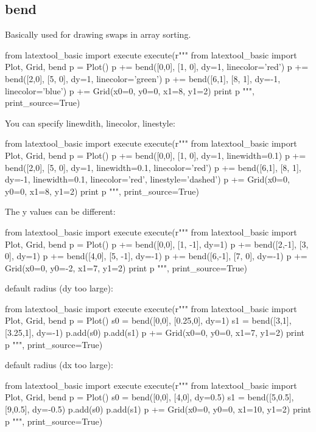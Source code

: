 \subsection{bend}

Basically used for drawing swaps in array sorting.


\begin{python}
from latextool_basic import execute
execute(r"""
from latextool_basic import Plot, Grid, bend
p = Plot()
p += bend([0,0], [1, 0], dy=1, linecolor='red')
p += bend([2,0], [5, 0], dy=1, linecolor='green')
p += bend([6,1], [8, 1], dy=-1, linecolor='blue')
p += Grid(x0=0, y0=0, x1=8, y1=2)
print p
""", print_source=True)
\end{python}


You can specify linewdith, linecolor, linestyle:
\begin{python}
from latextool_basic import execute
execute(r"""
from latextool_basic import Plot, Grid, bend
p = Plot()
p += bend([0,0], [1, 0], dy=1, linewidth=0.1)
p += bend([2,0], [5, 0], dy=1, linewidth=0.1, linecolor='red')
p += bend([6,1], [8, 1], dy=-1, linewidth=0.1, linecolor='red', 
          linestyle='dashed')
p += Grid(x0=0, y0=0, x1=8, y1=2)
print p
""", print_source=True)
\end{python}







The y values can be different:
\begin{python}
from latextool_basic import execute
execute(r"""
from latextool_basic import Plot, Grid, bend
p = Plot()
p += bend([0,0], [1, -1], dy=1)
p += bend([2,-1], [3, 0], dy=1)
p += bend([4,0], [5, -1], dy=-1)
p += bend([6,-1], [7, 0], dy=-1)
p += Grid(x0=0, y0=-2, x1=7, y1=2)
print p
""", print_source=True)
\end{python}



default radius (dy too large):
\begin{python}
from latextool_basic import execute
execute(r"""
from latextool_basic import Plot, Grid, bend
p = Plot()
s0 = bend([0,0], [0.25,0], dy=1)
s1 = bend([3,1], [3.25,1], dy=-1)
p.add(s0)
p.add(s1)
p += Grid(x0=0, y0=0, x1=7, y1=2)
print p
""", print_source=True)
\end{python}



default radius (dx too large):
\begin{python}
from latextool_basic import execute
execute(r"""
from latextool_basic import Plot, Grid, bend
p = Plot()
s0 = bend([0,0], [4,0], dy=0.5)
s1 = bend([5,0.5], [9,0.5], dy=-0.5)
p.add(s0)
p.add(s1)
p += Grid(x0=0, y0=0, x1=10, y1=2)
print p
""", print_source=True)
\end{python}

